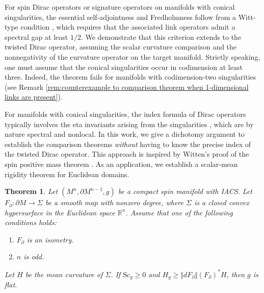 \documentclass[12pt, reqno]{amsart}
\theoremstyle{plain} %
\newtheorem{theorem}{Theorem}[section]
\theoremstyle{definition}
\theoremstyle{remark}
\numberwithin{equation}{section}
\newcommand{\onorm}[1]{\Vert #1 \Vert}
\newcommand{\bnd}[1]{\partial #1}
\newcommand{\field}[1]{\mathbb{#1}}
\newcommand{\R}{\field{R}}
\newcommand{\Sc}{\mathrm{Sc}}
\newcommand{\tdim}{n} %
\begin{document}
For spin Dirac operators or signature operators on manifolds with conical singularities, the essential self-adjointness and Fredholmness follow from a Witt-type condition \cite{Chou:1985,Bruning:1988,MR1449639,PierreJesse16,PiazzaPauloRosenberg23}, which requires that the associated link operators admit a spectral gap at least \(1/2\).
We demonstrate that this criterion extends to the twisted Dirac operator, assuming the scalar curvature comparison and the nonnegativity of the curvature operator on the target manifold.
Strictly speaking, one must assume that the conical singularities occur in codimension at least three. Indeed, the theorem fails for manifolds with codimension-two singularities (see Remark \ref{rem:counterexample to comparison theorem when 1-dimensional links are present}).

For manifolds with conical singularities, the index formula of Dirac operators typically involves the eta invariants arising from the singularities \cite[Main Theorem]{PierreJesse16}, which are by nature spectral and nonlocal.
In this work, we give a dichotomy argument to establish the comparison theorems \emph{without} having to know the precise index of the twisted Dirac operator. This approach is inspired by Witten's proof of the spin positive mass theorem \cite{MR626707}. As an application, we establish a scalar-mean rigidity theorem for Euclidean domains.

\begin{theorem}\label{thm:rigidity of NNSC fill-in - intro}
    Let \((M^{\tdim},\bnd{M}^{\tdim-1},g)\) be a compact spin manifold with IACS.
    Let \(F_\partial\colon\partial M\to\Sigma\) be a smooth map with nonzero degree, where \(\Sigma\) is a closed convex hypersurface in the Euclidean space $\R^n$.
    Assume that one of the following conditions holds:
    \begin{enumerate}[label=\((\roman*)\)]
        \item \(F_\partial\) is an isometry.
        \item \(n\) is odd.
    \end{enumerate}
    Let $H$ be the mean curvature of $\Sigma$. If \(\Sc_{g} \geq 0\) and \(H_{g} \geq \onorm{dF_\partial} (F_\partial)^*H\), then \(g\) is flat.
\end{theorem}
\end{document}
